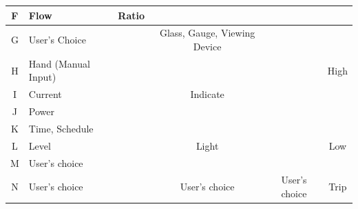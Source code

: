 \documentclass[11pt, openright]{book}
\begin{document}
\begin{table}[ht!]
{\begin{tabular}{|c|l|c|c|c|c|}
            \hline
            F                     & Flow                                                                                                      & Ratio                         &                                         &                 &                   \\
            \hline
            G                     & User's Choice                                                                                             &                               & Glass, Gauge, Viewing Device            &                 &                   \\
            \hline
            H                     & Hand (Manual Input)                                                                                       &                               &                                         &                 & High              \\
            \hline
            I                     & Current                                                                                                   &                               & Indicate                                &                 &                   \\
            \hline
            J                     & Power                                                                                                     &                               &                                         &                 &                   \\
            \hline
            K                     & Time, Schedule                                                                                            &                               &                                         &                 &                   \\
            \hline
            L                     & Level                                                                                                     &                               & Light                                   &                 & Low               \\
            \hline
            M                     & User's choice                                                                                             &                               &                                         &                 &                   \\
            \hline
            N                     & User's choice                                                                                             &                               & User's choice                           & User's choice   & Trip              \\

\end{tabular}}
\end{table}
\end{document}
